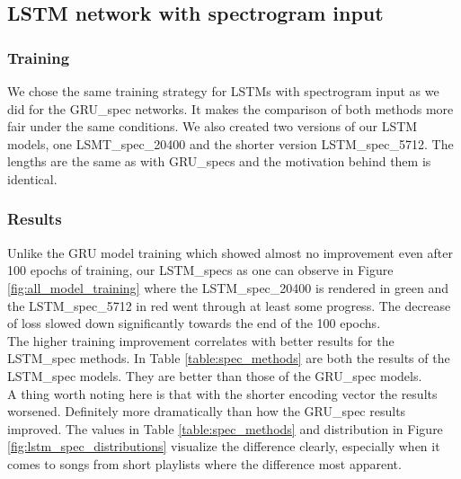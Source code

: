 \subsection{LSTM network with spectrogram input}

\subsubsection{Training}
We chose the same training strategy for LSTMs with spectrogram input as we did for the GRU\_spec networks. It makes the comparison of both methods more fair under the same conditions. We also created two versions of our LSTM models, one LSMT\_spec\_20400 and the shorter version LSTM\_spec\_5712. The lengths are the same as with GRU\_specs and the motivation behind them is identical.

\subsubsection{Results}
Unlike the GRU model training which showed almost no improvement even after 100 epochs of training, our LSTM\_specs as one can observe in Figure \ref{fig:all_model_training} where the LSTM\_spec\_20400 is rendered in green and the LSTM\_spec\_5712 in red went through at least some progress. The decrease of loss slowed down significantly towards the end of the 100 epochs. \\
The higher training improvement correlates with better results for the LSTM\_spec methods. In Table \ref{table:spec_methods} are both the results of the LSTM\_spec models. They are better than those of the GRU\_spec models. \\
A thing worth noting here is that with the shorter encoding vector the results worsened. Definitely more dramatically than how the GRU\_spec results improved. The values in Table \ref{table:spec_methods} and distribution in Figure \ref{fig:lstm_spec_distributions} visualize the difference clearly, especially when it comes to songs from short playlists where the difference most apparent.

